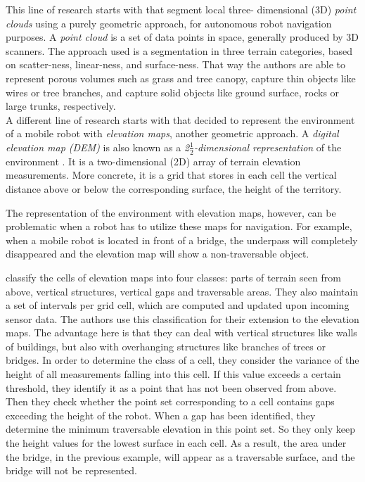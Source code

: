 \documentclass[12pt,a4paper,table,dvipsnames,tikz]{report}
\newcommand{\term}{\textit}
\newcommand{\acronym}{\MakeUppercase}
\newcommand{\itfrac}[2]{\frac{\textit{#1}}{\textit{#2}}}
\begin{document}
	This line of research starts with \citet{Lalonde} that segment local three-
	dimensional (\acronym{3d}) \term{point clouds} using a purely geometric 
	approach, for autonomous robot navigation purposes. A 
	\term{point cloud} is a set of data points in space, generally produced by 
	\acronym{3d} scanners. The approach used is a segmentation in three terrain 
	categories, based on scatter-ness, linear-ness, and surface-ness. That way 
	the authors are able to represent porous volumes such as grass and tree canopy, 
	capture thin objects like wires or tree branches, and capture solid objects 
	like ground surface, rocks or large trunks, respectively.
	\\	
	
	A different line of research starts with \citet{Pfaff} that decided to represent 
	the environment of a mobile robot with \term{elevation maps}, another geometric 
	approach. A \term{digital elevation map (\acronym{dem})} \citep{Kweon} is also 
	known as a \term{2\(\itfrac{1}{2}\)-dimensional representation} of the environment 
	\citep{Pfaff}. It is a two-dimensional (\acronym{2d}) array of terrain elevation 
	measurements. More concrete, it is a grid that stores in each cell the vertical 
	distance above or below the corresponding surface, the height of the territory. 
	\par 
	The representation of the environment with elevation maps, however, can 
	be problematic when a robot has to utilize these maps for navigation. For 
	example, when a mobile robot is located in front of a bridge, the underpass will 
	completely disappeared and the elevation map will show a non-traversable 
	object.
	\par
	\citet{Pfaff} classify the cells of elevation maps into four classes: 
	parts of terrain seen from above, vertical structures, vertical gaps and 
	traversable areas. They also maintain a set of intervals per grid cell, which 
	are computed and updated upon incoming sensor data. The authors use this 
	classification for their extension to the elevation maps. The advantage here is 
	that they can deal with vertical structures like walls of buildings, but also 
	with overhanging structures like branches of trees or bridges. In order to 
	determine the class of a cell, they consider the variance of the height of all 
	measurements falling into this cell. If this value exceeds a certain threshold, 
	they identify it as a point that has not been observed from above. Then they 
	check whether the point set corresponding to a cell	contains gaps exceeding the 
	height of the robot. When a gap has been identified, they determine the	minimum 
	traversable elevation in this point set. So they only keep the height values for 
	the lowest surface in each cell. As a result, the area under the bridge, in the 
	previous example, will appear as a traversable surface, and the bridge will not 
	be represented.
	\\
	
\end{document}
